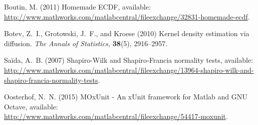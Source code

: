 \documentclass{article}
\begin{document}
\begin{thebibliography}{10}
Boutin, M. (2011)
Homemade {ECDF}, available:
  \url{http://www.mathworks.com/matlabcentral/fileexchange/32831-homemade-ecdf}.

Botev, Z.~I., Grotowski, J.~F., and Kroese (2010)
Kernel density estimation via diffusion.
{\em The Annals of Statistics,} {\bf 38}(5), 2916--2957.

Sa\"{i}da, A.~B. (2007)
Shapiro-Wilk and Shapiro-Francia normality tests, available:
  \url{http://www.mathworks.com/matlabcentral/fileexchange/13964-shapiro-wilk-and-shapiro-francia-normality-tests}.

Oosterhof, N.~N. (2015)
{MOxUnit} - An xUnit framework for Matlab and GNU Octave, available:
  \url{http://www.mathworks.com/matlabcentral/fileexchange/54417-moxunit}.

\end{thebibliography}
\end{document}

